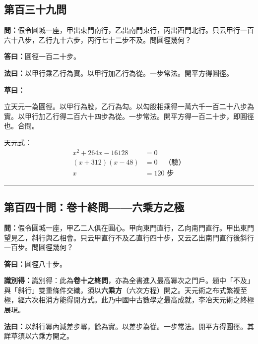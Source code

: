 \documentclass[11pt,a4paper]{article}
\newcommand{\longline}{\noindent\rule{\textwidth}{0.4pt}}
\newcommand{\wen}[1]{\par\noindent\textbf{\textcolor{probcolor}{問：}}{#1}\par}
\newcommand{\da}[1]{\par\noindent\textbf{\textcolor{anscolor}{答曰：}}{#1}\par}
\newcommand{\fayue}[1]{\par\noindent\textbf{\textcolor{methodcolor}{法曰：}}{#1}\par}
\newcommand{\caoyue}[1]{\par\noindent\textbf{草曰：}{#1}\par}
\newcommand{\zhi}[1]{\par\noindent\textbf{識別得：}{#1}\par}
\begin{document}
\subsection*{第百三十九問}
\wen{假令圓城一座，甲出東門南行，乙出南門東行，丙出西門北行。只云甲行一百六十八步，乙行九十六步，丙行七十二步不及。問圓徑幾何？}

\da{圓徑一百二十步。}

\fayue{以甲行乘乙行為實。以甲行加乙行為從。一步常法。開平方得圓徑。}

\caoyue{
立天元一為圓徑。以甲行為股，乙行為勾。以勾股相乘得一萬六千一百二十八步為實。以甲行加乙行得二百六十四步為從。一步常法。開平方得一百二十步，即圓徑也。合問。

天元式：
\begin{align*}
x^2 + 264x - 16128 &= 0 \\
(x + 312)(x - 48) &= 0 \quad \text{（驗）} \\
x &= 120 \text{ 步}
\end{align*}
}

\vspace{0.5cm}
\longline

\subsection*{第百四十問：卷十終問——六乘方之極}
\wen{假令圓城一座，甲乙二人俱在圓心。甲向東門直行，乙向南門直行。甲出東門望見乙，斜行與乙相會。只云甲直行不及乙直行四十步，又云乙出南門直行後斜行一百步。問圓徑幾何？}

\da{圓徑八十步。}

\zhi{識別得：此為\textbf{卷十之終問}，亦為全書進入最高冪次之門戶。題中「不及」與「斜行」雙重條件交織，須以\textbf{六乘方}（六次方程）開之。天元術之布式繁複至極，經六次相消方能得開方式。此乃中國中古數學之最高成就，李冶天元術之終極展現。}

\fayue{以斜行冪內減差步冪，餘為實。以差步為從。一步常法。開平方得圓徑。其詳草須以六乘方開之。}
\end{document}
